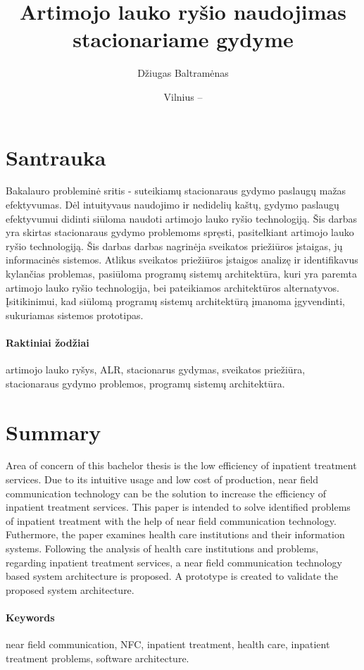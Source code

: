 \documentclass{VUMIFPSbakalaurinis}
\title{Artimojo lauko ryšio naudojimas stacionariame gydyme}
\author{Džiugas Baltramėnas}
\date{Vilnius – \the\year}
\begin{document}
\newpage


\maketitle


\section*{Santrauka}
Bakalauro probleminė sritis - suteikiamų stacionaraus gydymo paslaugų mažas efektyvumas. Dėl intuityvaus naudojimo ir nedidelių kaštų, gydymo paslaugų efektyvumui didinti siūloma naudoti artimojo lauko ryšio technologiją. Šis darbas yra skirtas stacionaraus gydymo problemoms spręsti, pasitelkiant artimojo lauko ryšio technologiją. Šis darbas darbas nagrinėja sveikatos priežiūros įstaigas, jų informacinės sistemos. Atlikus sveikatos priežiūros įstaigos analizę ir identifikavus kylančias problemas, pasiūloma programų sistemų architektūra, kuri yra paremta artimojo lauko ryšio technologija, bei pateikiamos architektūros alternatyvos. Įsitikinimui, kad siūlomą programų sistemų architektūrą įmanoma įgyvendinti, sukuriamas sistemos prototipas.


\paragraph{Raktiniai žodžiai}artimojo lauko ryšys, ALR, stacionarus gydymas, sveikatos priežiūra, stacionaraus gydymo problemos, programų sistemų architektūra.



\section*{Summary}
Area of concern of this bachelor thesis is the low efficiency of inpatient treatment services. Due to its intuitive usage and low cost of production, near field communication technology can be the solution to increase the efficiency of inpatient treatment services. This paper is intended to solve identified problems of inpatient treatment with the help of near field communication technology. Futhermore, the paper examines health care institutions and their information systems. Following the analysis of health care institutions and problems, regarding inpatient treatment services, a near field communication technology based system architecture is proposed. A prototype is created to validate the proposed system architecture.

\paragraph{Keywords}near field communication, NFC, inpatient treatment, health care, inpatient treatment problems, software architecture.
\end{document}

